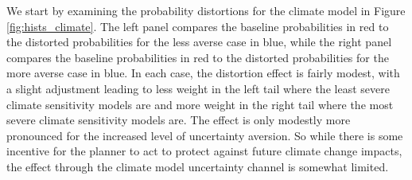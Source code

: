 \documentclass[12pt]{article}
\begin{document}

We start by examining the probability distortions for the climate model in Figure \ref{fig:hists_climate}. The left panel compares the baseline probabilities in red to the distorted probabilities for the less averse case in blue, while the right panel compares the baseline probabilities in red to the distorted probabilities for the more averse case in blue. In each case, the distortion effect is fairly modest, with a slight adjustment leading to less weight in the left tail where the least severe climate sensitivity models are and more weight in the right tail where the most severe climate sensitivity models are. The effect is only modestly more pronounced for the increased level of uncertainty aversion. So while there is some incentive for the planner to act to protect against future climate change impacts, the effect through the climate model uncertainty channel is somewhat limited. 
\end{document}
